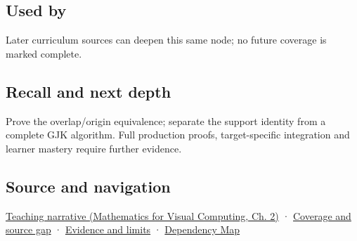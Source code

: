 \subsection{Used by}\label{appendix-215ac7099a82-used-by}

\hypertarget{appendix-215ac7099a82-used-by}{}

Later curriculum sources can deepen this same node; no future coverage is marked complete.

\subsection{Recall and next depth}\label{appendix-215ac7099a82-recall-and-next-depth}

\hypertarget{appendix-215ac7099a82-recall-and-next-depth}{}

Prove the overlap/origin equivalence; separate the support identity from a complete GJK algorithm. Full production proofs, target-specific integration and learner mastery require further evidence.

\subsection{Source and navigation}\label{appendix-215ac7099a82-source-and-navigation}

\hypertarget{appendix-215ac7099a82-source-and-navigation}{}

\href{../02-Mathematics-for-Visual-Computing/main.pdf\#nameddest=01-foundations-i-ch018-weighted-points-lead-from-affine-geometry-to-collision-shapes}{Teaching narrative (Mathematics for Visual Computing, Ch. 2)} · \hyperref[appendix-fd090d982a15-phase-6---parts-501-600]{Coverage and source gap} · \hyperref[appendix-a103e7846d21-phase-6---source-analysis-and-verification]{Evidence and limits} · \hyperref[appendix-4ad47bdd269a]{Dependency Map}
